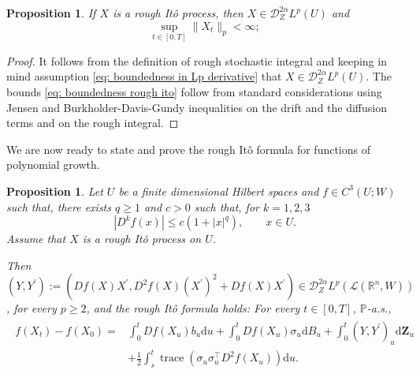 \documentclass[11pt,a4paper]{article}
\newcommand{\R}{\mathbb{R}}
\newcommand{\rd}{\mathrm{d}}
\theoremstyle{plain}
\newtheorem{prop}[defn]{Proposition}
\begin{document}
\begin{prop}
\label{pro: rough ito process is stoch controlled}
    If $X$ is a rough It\^o process, then
    $X\in \mathscr{D}_Z^{2\alpha} L^p(U)$ and
        \begin{equation}
        \label{eq: boundedness rough ito}
        \sup_{t\in[0,T]}\|X_t\|_{p} < \infty;
        \end{equation}
\end{prop}
    \begin{proof}
It follows from the definition of rough stochastic integral and keeping in mind assumption \eqref{eq: boundedness in Lp derivative} that $X\in \mathscr{D}_Z^{2\alpha} L^p(U)$. The bounds \eqref{eq: boundedness rough ito} follow from standard considerations using Jensen and Burkholder-Davis-Gundy inequalities on the drift and the diffusion terms and \cite[Lemma 2.12]{FHL21} on the rough integral.
\end{proof}
We are now ready to state and prove the rough It\^o formula for functions of polynomial growth.
\begin{prop}
     \label{prop: product formula}  
     Let $U$ be a finite dimensional Hilbert spaces and $f\in C^3(U;W)$ such that, there exists $q\geq1$ and $c>0$ such that, for $k=1,2,3$
    \begin{equation*}
        |D^kf(x)| \leq c(1+|x|^q),
        \qquad
        x\in U.
    \end{equation*}
    Assume that $X$ is a rough It\^o process on $U$.
    
    Then $(Y,Y^\prime) := (Df(X)X^{\prime}, D^2f(X)(X^{\prime})^2 + Df(X)X^{\prime})\in \mathscr{D}_Z^{2\alpha} L^p(\mathscr{L}(\R^n,W))$, for every $p\geq 2$, and the rough It\^o formula holds: For every $t\in [0,T]$, $\mathbb{P}$-a.s.,
        \begin{align}
        \label{eq: product formula}
        \begin{aligned}
            f(X_t) - f(X_0)
            = & \int_{0}^{t} Df(X_u) b_u \rd u
            + \int_{0}^{t} Df(X_u) \sigma_u \rd B_u
            + \int_{0}^{t} (Y,Y^{\prime})_u \rd \mathbf{Z}_u \\ & + \frac{1}{2} \int_{s}^{t} \operatorname{trace}(\sigma_u \sigma^{\top}_u D^2f(X_u)) \rd u.
                    \end{aligned}
        \end{align}
\end{prop}
\end{document}
